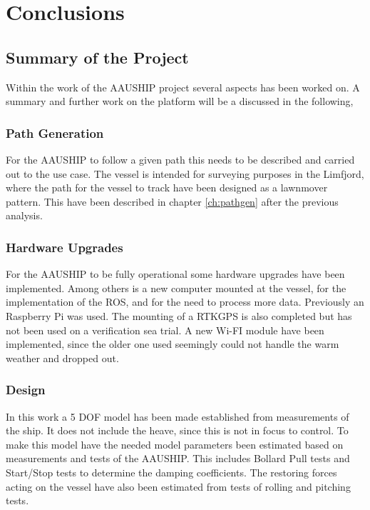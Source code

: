 \chapter{Conclusions}
\label{sc:FW}

\section{Summary of the Project}
Within the work of the AAUSHIP project several aspects has been worked on. A summary and further work on the platform will be a discussed in the following,

\subsection{Path Generation}
For the AAUSHIP to follow a given path this needs to be described and carried out to the use case. The vessel is intended for surveying purposes in the Limfjord, where the path for the vessel to track have been designed as a lawnmover pattern. This have been described in chapter \ref{ch:pathgen} after the previous analysis.

\subsection{Hardware Upgrades}
For the AAUSHIP to be fully operational some hardware upgrades have been implemented. Among others is a new computer mounted at the vessel, for the implementation of the \ac{ROS}, and for the need to process more data. Previously an Raspberry Pi was used. The mounting of a \ac{RTK}\ac{GPS} is also completed but has not been used on a verification sea trial. A new Wi-FI module have been implemented, since the older one used seemingly could not handle the warm weather and dropped out.

\subsection{Design}
In this work a 5 \ac{DOF} model has been made established from measurements of the ship. It does not include the heave, since this is not in focus to control. To make this model have the needed model parameters been estimated based on measurements and tests of the AAUSHIP. This includes Bollard Pull tests and Start/Stop tests to determine the damping coefficients. The restoring forces acting on the vessel have also been estimated from tests of rolling and pitching tests.

